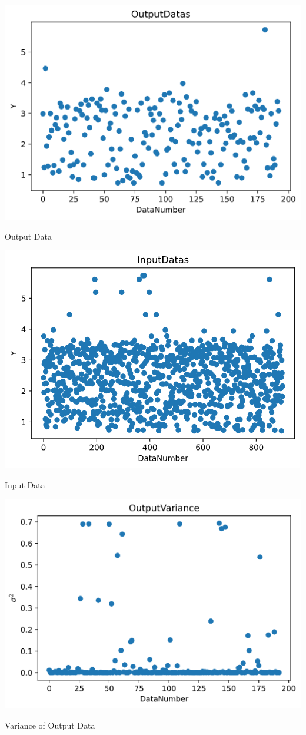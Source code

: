 \documentclass[11pt]{jsarticle}
\begin{document}
			\bfig[H]
			\centering
			\centering
			\includegraphics[scale=0.4]{./figure/OutputData.png}
			\caption{Output Data}
			\emini
			\centering
			\includegraphics[scale=0.4]{./figure/InputData.png}
			\caption{Input Data}
			\emini
			\efig
			
			\bfig[H]
			\centering
			\includegraphics[scale=0.4]{./figure/OutputVariance.png}
			\caption{Variance of Output Data}
			\efig
			
\end{document}
